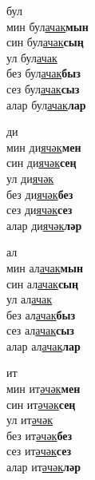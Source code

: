 \begin{multicols}{4}
\begin{enumerate}
\begin{minipage}{\linewidth}
    \item
    бул\\
    мин бул\underline{ачак}\textbf{мын}\\
    син бул\underline{ачак}\textbf{сың}\\
    ул бул\underline{ачак}\\
    без бул\underline{ачак}\textbf{быз}\\
    сез бул\underline{ачак}\textbf{сыз}\\
    алар бул\underline{ачак}\textbf{лар}\\
\end{minipage}

\begin{minipage}{\linewidth}
    \item
    ди\\
    мин ди\underline{ячәк}\textbf{мен}\\
    син ди\underline{ячәк}\textbf{сең}\\
    ул ди\underline{ячәк}\\
    без ди\underline{ячәк}\textbf{без}\\
    сез ди\underline{ячәк}\textbf{сез}\\
    алар ди\underline{ячәк}\textbf{ләр}\\
\end{minipage}

\begin{minipage}{\linewidth}
    \item
    ал\\
    мин ал\underline{ачак}\textbf{мын}\\
    син ал\underline{ачак}\textbf{сың}\\
    ул ал\underline{ачак}\\
    без ал\underline{ачак}\textbf{быз}\\
    сез ал\underline{ачак}\textbf{сыз}\\
    алар ал\underline{ачак}\textbf{лар}\\
\end{minipage}

\begin{minipage}{\linewidth}
    \item
    ит\\
    мин ит\underline{әчәк}\textbf{мен}\\
    син ит\underline{әчәк}\textbf{сең}\\
    ул ит\underline{әчәк}\\
    без ит\underline{әчәк}\textbf{без}\\
    сез ит\underline{әчәк}\textbf{сез}\\
    алар ит\underline{әчәк}\textbf{ләр}\\
\end{minipage}


\end{enumerate}
\end{multicols}
